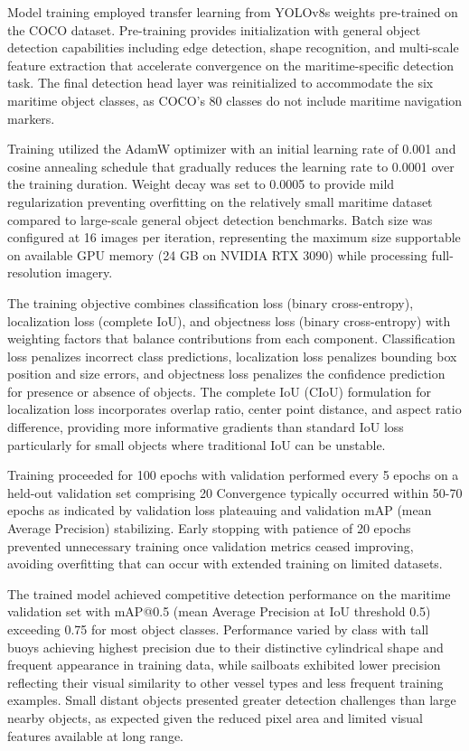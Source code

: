 Model training employed transfer learning from YOLOv8s weights pre-trained on the COCO dataset.
Pre-training provides initialization with general object detection capabilities including edge detection, shape recognition, and multi-scale feature extraction that accelerate convergence on the maritime-specific detection task.
The final detection head layer was reinitialized to accommodate the six maritime object classes, as COCO's 80 classes do not include maritime navigation markers.

Training utilized the AdamW optimizer with an initial learning rate of 0.001 and cosine annealing schedule that gradually reduces the learning rate to 0.0001 over the training duration.
Weight decay was set to 0.0005 to provide mild regularization preventing overfitting on the relatively small maritime dataset compared to large-scale general object detection benchmarks.
Batch size was configured at 16 images per iteration, representing the maximum size supportable on available GPU memory (24 GB on NVIDIA RTX 3090) while processing full-resolution imagery.

The training objective combines classification loss (binary cross-entropy), localization loss (complete IoU), and objectness loss (binary cross-entropy) with weighting factors that balance contributions from each component.
Classification loss penalizes incorrect class predictions, localization loss penalizes bounding box position and size errors, and objectness loss penalizes the confidence prediction for presence or absence of objects.
The complete IoU (CIoU) formulation for localization loss incorporates overlap ratio, center point distance, and aspect ratio difference, providing more informative gradients than standard IoU loss particularly for small objects where traditional IoU can be unstable.

Training proceeded for 100 epochs with validation performed every 5 epochs on a held-out validation set comprising 20%
Convergence typically occurred within 50-70 epochs as indicated by validation loss plateauing and validation mAP (mean Average Precision) stabilizing.
Early stopping with patience of 20 epochs prevented unnecessary training once validation metrics ceased improving, avoiding overfitting that can occur with extended training on limited datasets.

The trained model achieved competitive detection performance on the maritime validation set with mAP@0.5 (mean Average Precision at IoU threshold 0.5) exceeding 0.75 for most object classes.
Performance varied by class with tall buoys achieving highest precision due to their distinctive cylindrical shape and frequent appearance in training data, while sailboats exhibited lower precision reflecting their visual similarity to other vessel types and less frequent training examples.
Small distant objects presented greater detection challenges than large nearby objects, as expected given the reduced pixel area and limited visual features available at long range.

